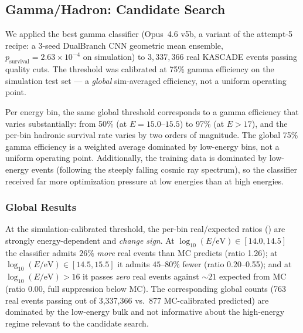 \documentclass[universe,article,submit,pdftex,oneauthor]{Definitions/mdpi}
\begin{document}
\subsection{Gamma/Hadron: Candidate Search}
\label{sec:real_gamma}

We applied the best gamma classifier (Opus~4.6 v5b, a variant of the attempt-5 recipe: a 3-seed DualBranch CNN geometric mean ensemble, $p_\mathrm{survival} = 2.63 \times 10^{-4}$ on simulation) to $3{,}337{,}366$ real KASCADE events passing quality cuts. The threshold was calibrated at 75\% gamma efficiency on the simulation test set --- a \emph{global} sim-averaged efficiency, not a uniform operating point.

Per energy bin, the same global threshold corresponds to a gamma efficiency that varies substantially: from 50\% (at $E = 15.0$--$15.5$) to 97\% (at $E > 17$), and the per-bin hadronic survival rate varies by two orders of magnitude. The global 75\% gamma efficiency is a weighted average dominated by low-energy bins, not a uniform operating point. Additionally, the training data is dominated by low-energy events (following the steeply falling cosmic ray spectrum), so the classifier received far more optimization pressure at low energies than at high energies.

\subsubsection{Global Results}

At the simulation-calibrated threshold, the per-bin real/expected ratios () are strongly energy-dependent and \emph{change sign}. At $\log_{10}(E/\mathrm{eV}) \in [14.0, 14.5]$ the classifier admits $26\%$ \emph{more} real events than MC predicts (ratio 1.26); at $\log_{10}(E/\mathrm{eV}) \in [14.5, 15.5]$ it admits $45$--$80\%$ fewer (ratio 0.20--0.55); and at $\log_{10}(E/\mathrm{eV}) > 16$ it passes \emph{zero} real events against ${\sim}21$ expected from MC (ratio 0.00, full suppression below MC). The corresponding global counts (763 real events passing out of 3{,}337{,}366 vs.\ 877 MC-calibrated predicted) are dominated by the low-energy bulk and not informative about the high-energy regime relevant to the candidate search.
\end{document}
